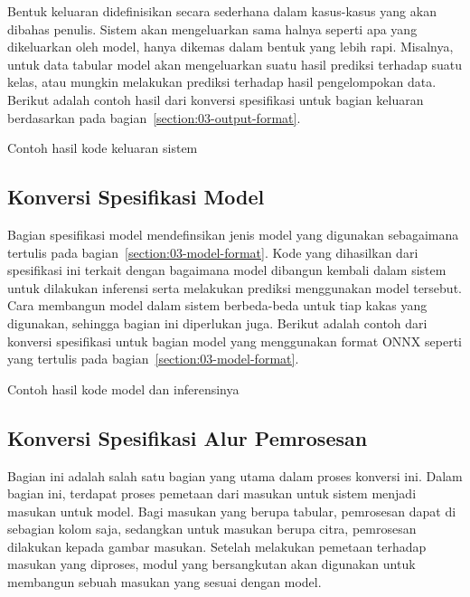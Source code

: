 Bentuk keluaran didefinisikan secara sederhana dalam kasus-kasus yang akan dibahas penulis.
Sistem akan mengeluarkan sama halnya seperti apa yang dikeluarkan oleh model, hanya dikemas dalam bentuk yang lebih rapi.
Misalnya, untuk data tabular model akan mengeluarkan suatu hasil prediksi terhadap suatu kelas, atau mungkin melakukan prediksi terhadap hasil pengelompokan data.
Berikut adalah contoh hasil dari konversi spesifikasi untuk bagian keluaran berdasarkan pada bagian~\ref{section:03-output-format}.

\begin{listing}[H]
	\caption{Contoh hasil kode keluaran sistem}
	\label{listing:11}
\end{listing}

\subsection{Konversi Spesifikasi Model}

Bagian spesifikasi model mendefinsikan jenis model yang digunakan sebagaimana tertulis pada bagian~\ref{section:03-model-format}.
Kode yang dihasilkan dari spesifikasi ini terkait dengan bagaimana model dibangun kembali dalam sistem untuk dilakukan inferensi serta melakukan prediksi menggunakan model tersebut.
Cara membangun model dalam sistem berbeda-beda untuk tiap kakas yang digunakan, sehingga bagian ini diperlukan juga.
Berikut adalah contoh dari konversi spesifikasi untuk bagian model yang menggunakan format ONNX seperti yang tertulis pada bagian~\ref{section:03-model-format}.

\begin{listing}[H]
	\caption{Contoh hasil kode model dan inferensinya}
	\label{listing:12}
\end{listing}

\subsection{Konversi Spesifikasi Alur Pemrosesan}

Bagian ini adalah salah satu bagian yang utama dalam proses konversi ini.
Dalam bagian ini, terdapat proses pemetaan dari masukan untuk sistem menjadi masukan untuk model.
Bagi masukan yang berupa tabular, pemrosesan dapat di sebagian kolom saja, sedangkan untuk masukan berupa citra, pemrosesan dilakukan kepada gambar masukan.
Setelah melakukan pemetaan terhadap masukan yang diproses, modul yang bersangkutan akan digunakan untuk membangun sebuah masukan yang sesuai dengan model.

